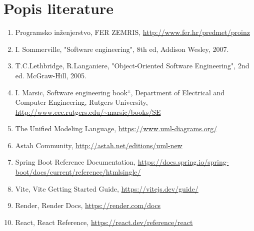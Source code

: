\chapter*{Popis literature}
	 	
	
		
		
		\begin{enumerate}
			
			
			\item  Programsko inženjerstvo, FER ZEMRIS, \url{http://www.fer.hr/predmet/proinz}
			
			\item  I. Sommerville, "Software engineering", 8th ed, Addison Wesley, 2007.
			
			\item  T.C.Lethbridge, R.Langaniere, "Object-Oriented Software Engineering", 2nd ed. McGraw-Hill, 2005.
			
			\item  I. Marsic, Software engineering book``, Department of Electrical and Computer Engineering, Rutgers University, \url{http://www.ece.rutgers.edu/~marsic/books/SE}
			
			\item  The Unified Modeling Language, \url{https://www.uml-diagrams.org/}
			
			\item  Astah Community, \url{http://astah.net/editions/uml-new}
			
			\item  Spring Boot Reference Documentation, \url{https://docs.spring.io/spring-boot/docs/current/reference/htmlsingle/}
			
			\item  Vite, Vite Getting Started Guide, \url{https://vitejs.dev/guide/}
			
			\item  Render, Render Docs, \url{https://render.com/docs}
			
			\item  React, React Reference, \url{https://react.dev/reference/react}
			
		\end{enumerate}
		
		 